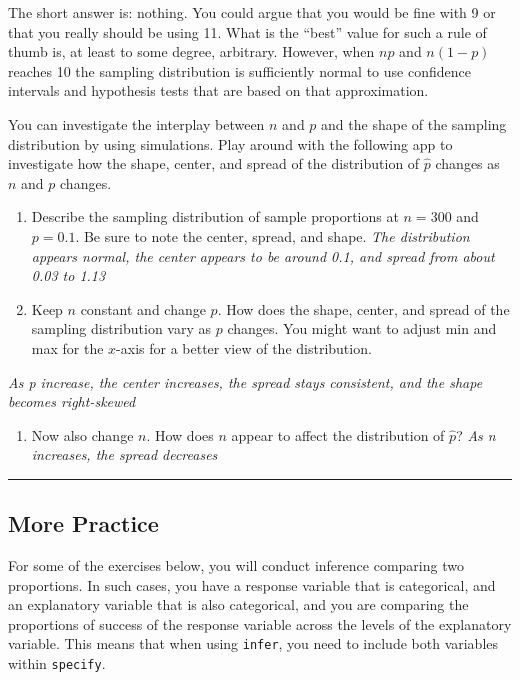 \documentclass[
]{article}
\providecommand{\tightlist}{%
  \setlength{\itemsep}{0pt}\setlength{\parskip}{0pt}}
\begin{document}
The short answer is: nothing. You could argue that you would be fine
with 9 or that you really should be using 11. What is the ``best'' value
for such a rule of thumb is, at least to some degree, arbitrary.
However, when \(np\) and \(n(1-p)\) reaches 10 the sampling distribution
is sufficiently normal to use confidence intervals and hypothesis tests
that are based on that approximation.

You can investigate the interplay between \(n\) and \(p\) and the shape
of the sampling distribution by using simulations. Play around with the
following app to investigate how the shape, center, and spread of the
distribution of \(\hat{p}\) changes as \(n\) and \(p\) changes.

\begin{enumerate}
\def\labelenumi{\arabic{enumi}.}
\setcounter{enumi}{5}
\item
  Describe the sampling distribution of sample proportions at
  \(n = 300\) and \(p = 0.1\). Be sure to note the center, spread, and
  shape. \emph{The distribution appears normal, the center appears to be
  around 0.1, and spread from about 0.03 to 1.13}
\item
  Keep \(n\) constant and change \(p\). How does the shape, center, and
  spread of the sampling distribution vary as \(p\) changes. You might
  want to adjust min and max for the \(x\)-axis for a better view of the
  distribution.
\end{enumerate}

\emph{As p increase, the center increases, the spread stays consistent,
and the shape becomes right-skewed}

\begin{enumerate}
\def\labelenumi{\arabic{enumi}.}
\setcounter{enumi}{7}
\tightlist
\item
  Now also change \(n\). How does \(n\) appear to affect the
  distribution of \(\hat{p}\)? \emph{As n increases, the spread
  decreases}
\end{enumerate}

\begin{center}\rule{0.5\linewidth}{0.5pt}\end{center}

\hypertarget{more-practice}{%
\subsection{More Practice}\label{more-practice}}

For some of the exercises below, you will conduct inference comparing
two proportions. In such cases, you have a response variable that is
categorical, and an explanatory variable that is also categorical, and
you are comparing the proportions of success of the response variable
across the levels of the explanatory variable. This means that when
using \texttt{infer}, you need to include both variables within
\texttt{specify}.
\end{document}
